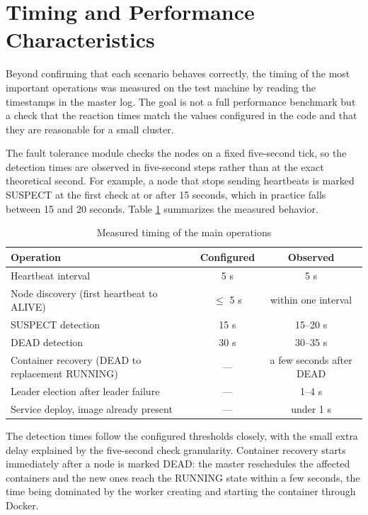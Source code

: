 \section{Timing and Performance Characteristics}

Beyond confirming that each scenario behaves correctly, the timing of the most important operations was measured on the test machine by reading the timestamps in the master log. The goal is not a full performance benchmark but a check that the reaction times match the values configured in the code and that they are reasonable for a small cluster.

The fault tolerance module checks the nodes on a fixed five-second tick, so the detection times are observed in five-second steps rather than at the exact theoretical second. For example, a node that stops sending heartbeats is marked SUSPECT at the first check at or after 15 seconds, which in practice falls between 15 and 20 seconds. Table \ref{tab:timing} summarizes the measured behavior.

\begin{table}[H]
    \centering
    \caption{Measured timing of the main operations}
    \label{tab:timing}
    \begin{tabular}{|l|c|c|}
        \hline
        \textbf{Operation} & \textbf{Configured} & \textbf{Observed} \\
        \hline
        Heartbeat interval & 5 s & 5 s \\
        \hline
        Node discovery (first heartbeat to ALIVE) & $\leq$ 5 s & within one interval \\
        \hline
        SUSPECT detection & 15 s & 15--20 s \\
        \hline
        DEAD detection & 30 s & 30--35 s \\
        \hline
        Container recovery (DEAD to replacement RUNNING) & --- & a few seconds after DEAD \\
        \hline
        Leader election after leader failure & --- & 1--4 s \\
        \hline
        Service deploy, image already present & --- & under 1 s \\
        \hline
    \end{tabular}
\end{table}

The detection times follow the configured thresholds closely, with the small extra delay explained by the five-second check granularity. Container recovery starts immediately after a node is marked DEAD: the master reschedules the affected containers and the new ones reach the RUNNING state within a few seconds, the time being dominated by the worker creating and starting the container through Docker.

